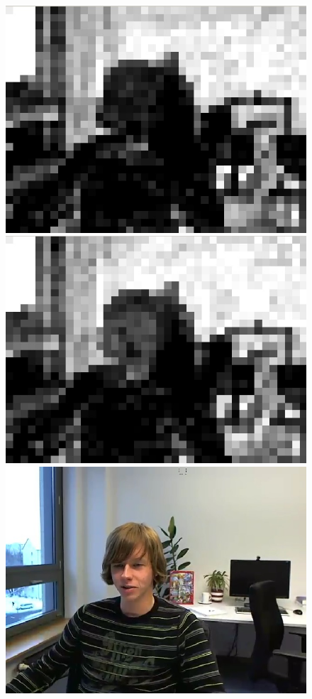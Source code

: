 \documentclass[11pt]{article} %
\begin{document}
\begin{figure}[!h]
    \centering
    \includegraphics[scale=0.4]{PaulDefault120_91250kbps_psnr}
    \includegraphics[scale=0.4]{QPOffset/paul120_250kbps_QPoffset4_psnr}
    \includegraphics[scale=0.4]{PaulDefault120_91250kbps}

\end{figure}
\end{document}

